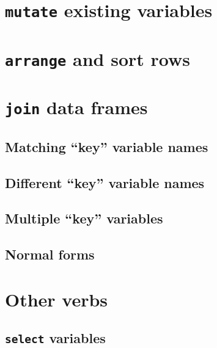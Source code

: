 \documentclass[
  12pt, krantz2,
]{krantz}
\begin{document}
\hypertarget{mutate}{%
\section{\texorpdfstring{\texttt{mutate} existing variables}{mutate existing variables}}\label{mutate}}

\hypertarget{arrange}{%
\section{\texorpdfstring{\texttt{arrange} and sort rows}{arrange and sort rows}}\label{arrange}}

\hypertarget{joins}{%
\section{\texorpdfstring{\texttt{join} data frames}{join data frames}}\label{joins}}

\hypertarget{matching-key-variable-names}{%
\subsection{Matching ``key'' variable names}\label{matching-key-variable-names}}

\hypertarget{diff-key}{%
\subsection{Different ``key'' variable names}\label{diff-key}}

\hypertarget{multiple-key-variables}{%
\subsection{Multiple ``key'' variables}\label{multiple-key-variables}}

\hypertarget{normal-forms}{%
\subsection{Normal forms}\label{normal-forms}}

\hypertarget{other-verbs}{%
\section{Other verbs}\label{other-verbs}}

\hypertarget{select}{%
\subsection{\texorpdfstring{\texttt{select} variables}{select variables}}\label{select}}
\end{document}
